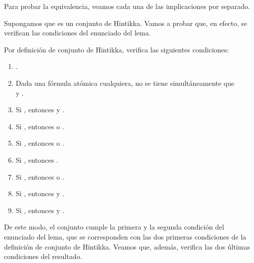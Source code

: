 \begin{isabellebody}
\begin{isamarkuptext}
\begin{demostracion}
  Para probar la equivalencia, veamos cada una de las implicaciones por separado.

\textbf{}

  Supongamos que  es un conjunto de Hintikka. Vamos a probar que, en efecto, se 
  verifican las condiciones del enunciado del lema.

  Por definición de conjunto de Hintikka,  verifica las siguientes condiciones:
  \begin{enumerate}
    \item {}.
    \item Dada  una fórmula atómica cualquiera, no se tiene 
      simultáneamente que\\  y .
    \item Si , entonces  y .
    \item Si , entonces  o .
    \item Si , entonces  o .
    \item Si , entonces .
    \item Si , entonces  o .
    \item Si , entonces  y . 
    \item Si , entonces  y . 
  \end{enumerate}  
  De este modo, el conjunto  cumple la primera y la segunda condición del
  enunciado del lema, que se corresponden con las dos primeras condiciones
  de la definición de conjunto de Hintikka. Veamos que, además, verifica las
  dos últimas condiciones del resultado.


\end{demostracion}
\end{isamarkuptext}
\end{isabellebody}
